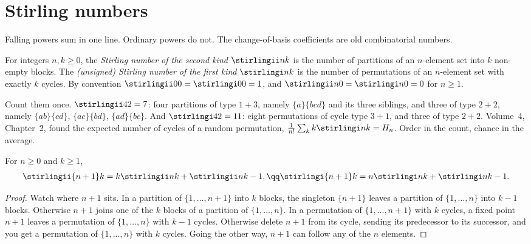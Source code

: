 \section{Stirling numbers}

Falling powers sum in one line. Ordinary powers do not. The change-of-basis coefficients are old combinatorial numbers.

\begin{definition}
For integers $n,k\ge0$, the \emph{Stirling number of the second kind} $\stirlingii nk$ is the number of partitions of an
$n$-element set into $k$ non-empty blocks. The \emph{(unsigned) Stirling number of the first kind} $\stirlingi nk$ is the
number of permutations of an $n$-element set with exactly $k$ cycles. By convention $\stirlingii00=\stirlingi00=1$, and
$\stirlingii n0=\stirlingi n0=0$ for $n\ge1$.
\end{definition}

Count them once. $\stirlingii42=7$: four partitions of type $1+3$, namely $\{a\}\{bcd\}$ and its three siblings, and three of type $2+2$, namely $\{ab\}\{cd\}$, $\{ac\}\{bd\}$, $\{ad\}\{bc\}$. And $\stirlingi42=11$: eight permutations of cycle type $3+1$, and three of type $2+2$. Volume~4, Chapter~2, found the expected number of cycles of a random permutation, $\frac1{n!}\sum_kk\stirlingi nk=H_n$. Order in the count, chance in the average.

\begin{proposition}\label{prop:stirlingrec}
For $n\ge0$ and $k\ge1$,
\[
\begin{gathered}\stirlingii{n+1}k=k\stirlingii nk+\stirlingii n{k-1},\qq\stirlingi{n+1}k=n\stirlingi nk+\stirlingi n{k-1}.\end{gathered}
\]
\end{proposition}
\begin{proof}
Watch where $n+1$ sits. In a partition of $\{1,\dots,n+1\}$ into $k$ blocks, the singleton $\{n+1\}$ leaves a partition of $\{1,\dots,n\}$ into $k-1$ blocks. Otherwise $n+1$ joins one of the $k$ blocks of a partition of $\{1,\dots,n\}$. In a permutation of $\{1,\dots,n+1\}$ with $k$ cycles, a fixed point $n+1$ leaves a permutation of $\{1,\dots,n\}$ with $k-1$ cycles. Otherwise delete $n+1$ from its cycle, sending its predecessor to its successor, and you get a permutation of $\{1,\dots,n\}$ with $k$ cycles. Going the other way, $n+1$ can follow any of the $n$ elements.
\end{proof}


